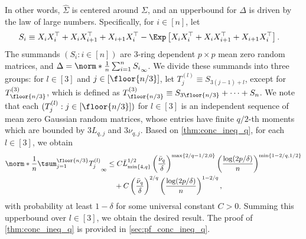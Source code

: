 \documentclass[aos]{imsart}
\begin{document}
\begin{appendix}
In other words, $\hat\Sigma$ is centered around $\Sigma$, and an upperbound for $\Delta$ is driven by the law of large numbers. Specifically, for $i \in [n]$, let 
\begin{equation*}
\begin{aligned}
    S_i 
    & \equiv  X_i X_i^\top + X_i X_{i+1}^\top + X_{i+1} X_i^\top
    - \Exp\left[
        X_i X_i^\top + X_i X_{i+1}^\top + X_{i+1} X_i^\top
    \right].
\end{aligned}
\end{equation*}
The summands $(S_i: i \in [n])$ are $3$-ring dependent $p \times p$ mean zero random matrices, and $\Delta = \norm*{\frac{1}{n} \sum_{i=1}^{n} S_i}_\infty$. We divide these summands into three groups: 
for $l \in [3]$ and $j \in [\floor{n/3}]$, let $T^{(l)}_j \equiv S_{3(j-1)+l}$, except for $T^{(3)}_{\floor{n/3}}$, which is defined as $T^{(3)}_{\floor{n/3}} \equiv S_{3\floor{n/3}} + \dots + S_n$. We note that each $(T^{(l)}_j: j \in [\floor{n/3}])$ for $l \in [3]$ is an independent sequence of mean zero Gaussian random matrices, whose entries have finite $q/2$-th moments which are bounded by $3 L_{q,j}$ and $3 \nu_{q,j}$. Based on \cref{thm:conc_ineq_q}, for each $l \in [3]$, we obtain
\begin{equation} \label{eq:conc_ineq_Sigma}
\begin{aligned}
    \norm*{\frac{1}{n} \tsum_{j=1}^{\floor{n/3}} T^{(l)}_j}_\infty 
    & \leq C \bar{L}_{\min\{4, q\}}^{1/2} \left(\frac{\bar{\nu}_{q}}{\delta} \right)^{\max\{2/q-1/2,0\}}
    \left(\frac{\log(2p/\delta)}{n}\right)^{\min\{1-2/q, 1/2\}} \\
    & \quad + C \left(\frac{\bar{\nu}_{q}}{\delta} \right)^{2/q} \left(\frac{\log(2p/\delta)}{n}\right)^{1-2/q},
\end{aligned}
\end{equation}
with probability at least $1-\delta$ for some universal constant $C > 0$. Summing this upperbound over $l \in [3]$, we obtain the desired result. The proof of \cref{thm:conc_ineq_q} is provided in \cref{sec:pf_conc_ineq_q}.


\end{appendix}
\end{document}
